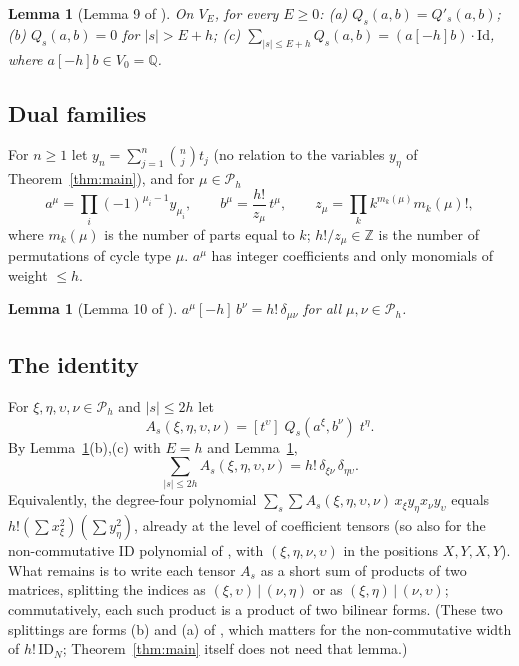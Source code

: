 \documentclass[11pt]{amsart}
\newtheorem{lemma}[theorem]{Lemma}
\theoremstyle{remark}
\newcommand{\Q}{\mathbb{Q}}
\newcommand{\Z}{\mathbb{Z}}
\newcommand{\cP}{\mathcal{P}}
\begin{document}
\begin{lemma}[Lemma 9 of \cite{ETH}]\label{lem:Q}
On $V_E$, for every $E\ge0$:
(a) $Q_s(a,b)=Q'_s(a,b)$;
(b) $Q_s(a,b)=0$ for $|s|>E+h$;
(c) $\sum_{|s|\le E+h}Q_s(a,b)=(a[-h]b)\cdot\mathrm{Id}$, where $a[-h]b\in V_0=\Q$.
\end{lemma}

\subsection{Dual families}
For $n\ge1$ let $y_n=\sum_{j=1}^n\binom nj t_j$ (no relation to the variables $y_\eta$ of Theorem~\ref{thm:main}), and for $\mu\in\cP_h$
\[a^\mu=\prod_i(-1)^{\mu_i-1}y_{\mu_i},\qquad b^\mu=\frac{h!}{z_\mu}\,t^\mu,\qquad z_\mu=\prod_kk^{m_k(\mu)}m_k(\mu)!,\]
where $m_k(\mu)$ is the number of parts equal to $k$; $h!/z_\mu\in\Z$ is the number of permutations of cycle type $\mu$.
$a^\mu$ has integer coefficients and only monomials of weight $\le h$.

\begin{lemma}[Lemma 10 of \cite{ETH}]\label{lem:dual}
$a^\mu[-h]\,b^\nu=h!\,\delta_{\mu\nu}$ for all $\mu,\nu\in\cP_h$.
\end{lemma}

\subsection{The identity}
For $\xi,\eta,\upsilon,\nu\in\cP_h$ and $|s|\le2h$ let
\begin{equation}\tag{53}
A_s(\xi,\eta,\upsilon,\nu)=[t^\upsilon]\;Q_s(a^\xi,b^\nu)\;t^\eta .
\end{equation}
By Lemma~\ref{lem:Q}(b),(c) with $E=h$ and Lemma~\ref{lem:dual},
\begin{equation}\label{eq:cross}
\sum_{|s|\le2h}A_s(\xi,\eta,\upsilon,\nu)=h!\,\delta_{\xi\nu}\,\delta_{\eta\upsilon}.
\end{equation}
Equivalently, the degree-four polynomial $\sum_s\sum A_s(\xi,\eta,\upsilon,\nu)\,x_\xi y_\eta x_\nu y_\upsilon$ equals
$h!(\sum x_\xi^2)(\sum y_\eta^2)$, already at the level of coefficient tensors (so also for the non-commutative
$\mathrm{ID}$ polynomial of \cite{HWY}, with $(\xi,\eta,\nu,\upsilon)$ in the positions $X,Y,X,Y$). What remains is to
write each tensor $A_s$ as a short sum of products of two matrices, splitting the indices as $(\xi,\upsilon)\,|\,(\nu,\eta)$
or as $(\xi,\eta)\,|\,(\nu,\upsilon)$; commutatively, each such product is a product of two bilinear forms. (These two
splittings are forms (b) and (a) of \cite[Lemma~3.5]{HWY}, which matters for the non-commutative width of
$h!\,\mathrm{ID}_N$; Theorem~\ref{thm:main} itself does not need that lemma.)
\end{document}
